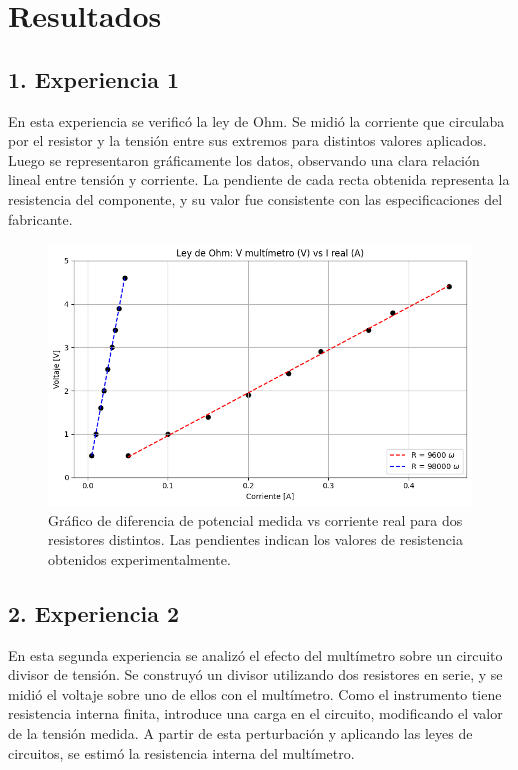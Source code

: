 \documentclass[11pt]{article}
\begin{document}
\section*{Resultados}

\subsection*{1. Experiencia 1}

En esta experiencia se verificó la ley de Ohm. Se midió la corriente que circulaba por el resistor y la tensión entre sus extremos para distintos valores aplicados. Luego se representaron gráficamente los datos, observando una clara relación lineal entre tensión y corriente. La pendiente de cada recta obtenida representa la resistencia del componente, y su valor fue consistente con las especificaciones del fabricante.

\begin{figure}[H]
    \centering
    \includegraphics[width=0.8\linewidth]{Ohm.png}
    \caption{Gráfico de diferencia de potencial medida vs corriente real para dos resistores distintos. Las pendientes indican los valores de resistencia obtenidos experimentalmente.}
    \label{fig:ohm}
\end{figure}

\subsection*{2. Experiencia 2}

En esta segunda experiencia se analizó el efecto del multímetro sobre un circuito divisor de tensión. Se construyó un divisor utilizando dos resistores en serie, y se midió el voltaje sobre uno de ellos con el multímetro. Como el instrumento tiene resistencia interna finita, introduce una carga en el circuito, modificando el valor de la tensión medida. A partir de esta perturbación y aplicando las leyes de circuitos, se estimó la resistencia interna del multímetro.
\end{document}
